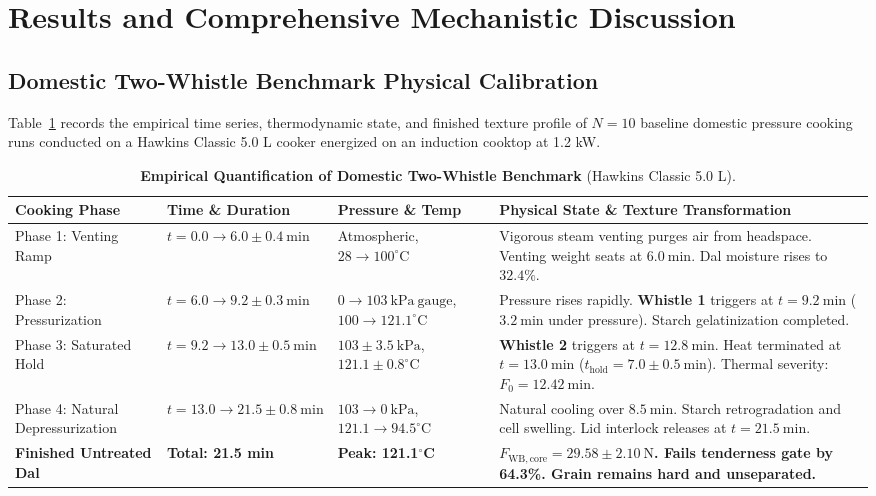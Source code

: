 \documentclass[10pt,a4paper]{article}
\begin{document}
\section{Results and Comprehensive Mechanistic Discussion}

\subsection{Domestic Two-Whistle Benchmark Physical Calibration}
Table~\ref{tab:domestic_calibration_exp} records the empirical time series, thermodynamic state, and finished texture profile of $N = 10$ baseline domestic pressure cooking runs conducted on a Hawkins Classic 5.0 L cooker energized on an induction cooktop at 1.2 kW.

\begin{table}[H]
\centering
\footnotesize
\setlength{\tabcolsep}{3.5pt}
\caption{\textbf{Empirical Quantification of Domestic Two-Whistle Benchmark} (Hawkins Classic 5.0 L).}
\label{tab:domestic_calibration_exp}
\begin{tabularx}{\linewidth}{p{2.6cm}p{3.2cm}p{3.0cm}>{\raggedright\arraybackslash}X}
\toprule
\textbf{Cooking Phase} & \textbf{Time \& Duration} & \textbf{Pressure \& Temp} & \textbf{Physical State \& Texture Transformation} \\
\midrule
Phase 1: Venting Ramp & $t = 0.0 \rightarrow 6.0 \pm 0.4\ \mathrm{min}$ & Atmospheric, $28 \rightarrow 100^\circ\mathrm{C}$ & Vigorous steam venting purges air from headspace. Venting weight seats at $6.0\ \mathrm{min}$. Dal moisture rises to $32.4\%$. \\
Phase 2: Pressurization & $t = 6.0 \rightarrow 9.2 \pm 0.3\ \mathrm{min}$ & $0 \rightarrow 103\ \mathrm{kPa\ gauge}$, $100 \rightarrow 121.1^\circ\mathrm{C}$ & Pressure rises rapidly. \textbf{Whistle 1} triggers at $t = 9.2\ \mathrm{min}$ ($3.2\ \mathrm{min}$ under pressure). Starch gelatinization completed. \\
Phase 3: Saturated Hold & $t = 9.2 \rightarrow 13.0 \pm 0.5\ \mathrm{min}$ & $103 \pm 3.5\ \mathrm{kPa}$, $121.1 \pm 0.8^\circ\mathrm{C}$ & \textbf{Whistle 2} triggers at $t = 12.8\ \mathrm{min}$. Heat terminated at $t = 13.0\ \mathrm{min}$ ($t_{\mathrm{hold}} = 7.0 \pm 0.5\ \mathrm{min}$). Thermal severity: $F_0 = 12.42\ \mathrm{min}$. \\
Phase 4: Natural Depressurization & $t = 13.0 \rightarrow 21.5 \pm 0.8\ \mathrm{min}$ & $103 \rightarrow 0\ \mathrm{kPa}$, $121.1 \rightarrow 94.5^\circ\mathrm{C}$ & Natural cooling over $8.5\ \mathrm{min}$. Starch retrogradation and cell swelling. Lid interlock releases at $t = 21.5\ \mathrm{min}$. \\
\midrule
\textbf{Finished Untreated Dal} & \textbf{Total: 21.5 min} & \textbf{Peak: 121.1$^\circ$C} & \textbf{$F_{\mathrm{WB,core}} = 29.58 \pm 2.10\ \mathrm{N}$. Fails tenderness gate by 64.3\%. Grain remains hard and unseparated.} \\
\bottomrule
\end{tabularx}
\end{table}
\end{document}
